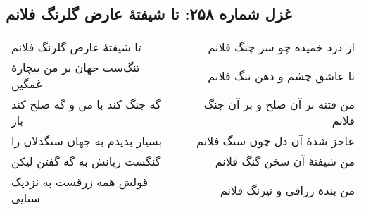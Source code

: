 \begin{center}
\section*{غزل شماره ۲۵۸: تا شیفتهٔ عارض گلرنگ فلانم}
\label{sec:258}
\begin{longtable}{l p{0.5cm} r}
تا شیفتهٔ عارض گلرنگ فلانم
&&
از درد خمیده چو سر چنگ فلانم
\\
تنگ‌ست جهان بر من بیچارهٔ غمگین
&&
تا عاشق چشم و دهن تنگ فلانم
\\
گه جنگ کند با من و گه صلح کند باز
&&
من فتنه بر آن صلح و بر آن جنگ فلانم
\\
بسیار بدیدم به جهان سنگدلان را
&&
عاجز شدهٔ آن دل چون سنگ فلانم
\\
گنگست زبانش به گه گفتن لیکن
&&
من شیفتهٔ آن سخن گنگ فلانم
\\
قولش همه زرقست به نزدیک سنایی
&&
من بندهٔ زراقی و نیرنگ فلانم
\\
\end{longtable}
\end{center}
